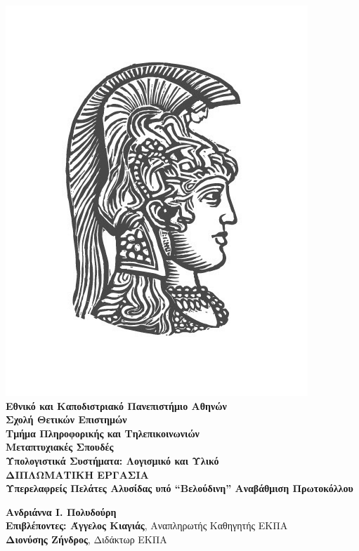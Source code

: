 \begin{center}
    
    \includegraphics[scale=0.7]{figures/logo_uoa.jpg}\\
    {\Large \textbf{Εθνικό και Καποδιστριακό Πανεπιστήμιο Αθηνών}} \\ 
    {\large \textbf{Σχολή Θετικών Επιστημών}} \\ 
    {\large \textbf{Τμήμα Πληροφορικής και Τηλεπικοινωνιών}}\\
    \vspace{1cm}
    {\large \textbf{Μεταπτυχιακές Σπουδές}} \\ 
    {\large \textbf{Υπολογιστικά Συστήματα: Λογισμικό και Υλικό}}\\
    \vspace{20mm}
    {\large \textbf{ΔΙΠΛΩΜΑΤΙΚΗ ΕΡΓΑΣΙΑ}}\\
    \vspace{0.7cm}
    {\textbf{\Large Υπερελαφρείς Πελάτες Αλυσίδας υπό ``Βελούδινη'' Αναβάθμιση Πρωτοκόλλου}}\\
    \vspace{2cm}

    \textbf{ Ανδριάννα I. Πολυδούρη} \\ 
    \vspace{2.0cm} 
    \textbf{ Επιβλέποντες: Άγγελος Κιαγιάς}, Αναπληρωτής Καθηγητής ΕΚΠΑ\\
    \hspace{0.77cm}
    \textbf{ Διονύσης Ζήνδρος}, Διδάκτωρ ΕΚΠΑ
    \vspace{2cm}

    \date{\textbf{ΑΘHΝΑ} \\ \textbf{ΙΟYΝΙΟΣ 2020}}
    \pagebreak
\end{center}